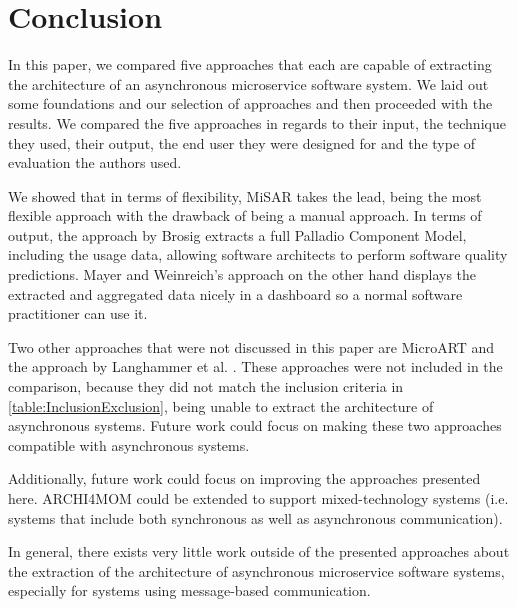 
\section{Conclusion}
\label{cha:Conclusion}
In this paper, we compared five approaches that each are capable of extracting the architecture of an asynchronous microservice software system.
We laid out some foundations and our selection of approaches and then proceeded with the results.
We compared the five approaches in regards to their input, the technique they used, their output, the end user they were designed for and the type of evaluation the authors used.

We showed that in terms of flexibility, MiSAR \cite{Alshuqayran2018MiSAR} takes the lead, being the most flexible approach with the drawback of being a manual approach.
In terms of output, the approach by Brosig \cite{Brosig2011} extracts a full Palladio Component Model, including the usage data, allowing software architects to perform software quality predictions.
Mayer and Weinreich's approach \cite{Mayer2018} on the other hand displays the extracted and aggregated data nicely in a dashboard so a normal software practitioner can use it.

Two other approaches that were not discussed in this paper are MicroART \cite{Granchelli2017MicroART} and the approach by Langhammer et al. \cite{Langhammer2016}.
These approaches were not included in the comparison, because they did not match the inclusion criteria in \autoref{table:InclusionExclusion}, being unable to extract the architecture of asynchronous systems.
Future work could focus on making these two approaches compatible with asynchronous systems.

Additionally, future work could focus on improving the approaches presented here.
ARCHI4MOM could be extended to support mixed-technology systems (i.e. systems that include both synchronous as well as asynchronous communication).

In general, there exists very little work outside of the presented approaches about the extraction of the architecture of asynchronous microservice software systems, especially for systems using message-based communication.